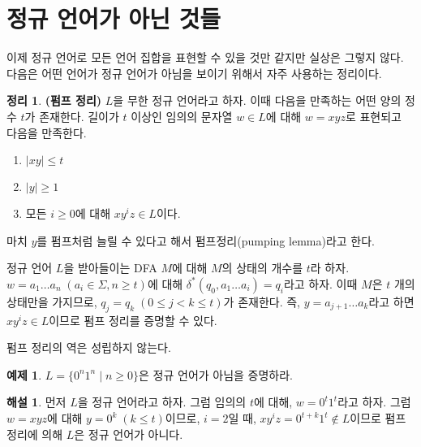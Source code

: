 \documentclass[b5paper, 11pt]{book}
\theoremstyle{definition}
\newtheorem{thm}[defn]{정리}
\newtheorem{ex}[defn]{예제}
\newtheorem*{ans*}{해설}
\newenvironment{pf*}{\pushQED{\qed}\pf}
{\popQED\endpf}
\begin{document}
\section{정규 언어가 아닌 것들}
이제 정규 언어로 모든 언어 집합을 표현할 수 있을 것만 같지만 실상은 그렇지 않다. 다음은 어떤 언어가 정규 언어가 아님을 보이기 위해서 자주 사용하는 정리이다.
\begin{thm}
    \textbf{(펌프 정리)}
    $L$을 무한 정규 언어라고 하자. 이때 다음을 만족하는 어떤 양의 정수 $t$가 존재한다. 길이가 $t$ 이상인 임의의 문자열 $w \in L$에 대해 $w = xyz$로 표현되고 다음을 만족한다.
\begin{enumerate}
    \item $\vert xy \vert \le t$
    \item $\vert y \vert \ge 1$
    \item 모든 $i \ge 0$에 대해 $xy^{i}z \in L$이다.
\end{enumerate}
\end{thm}
마치 $y$를 펌프처럼 늘릴 수 있다고 해서 펌프정리(pumping lemma)라고 한다. 
\begin{pf*}
    정규 언어 $L$을 받아들이는 DFA $M$에 대해 $M$의 상태의 개수를 $t$라 하자. $w = a_1 \ldots a_n \; (a_i \in \Sigma, n \ge t)$에 대해 $\delta^*(q_0, a_1 \ldots a_i) = q_i$라고 하자. 이때 $M$은 $t$ 개의 상태만을 가지므로, $q_j = q_k \; (0 \le j < k \le t) $가 존재한다. 즉, $y = a_{j+1} \ldots a_k$라고 하면 $xy^iz \in L$이므로 펌프 정리를 증명할 수 있다.  
\begin{figure}[ht]
    \centering
    \caption{} 
    \label{pump}
\end{figure}
\end{pf*}
펌프 정리의 역은 성립하지 않는다. 
\begin{ex} \label{0n1n}
$L = \{0^n 1^n \;\vert\; n \ge 0\}$은 정규 언어가 아님을 증명하라.
\end{ex}
\begin{ans*}
    먼저 $L$을 정규 언어라고 하자. 그럼 임의의 $t$에 대해, $w = 0^t 1^t$라고 하자. 그럼 $w=xyz$에 대해 $y = 0^k \;(k \le t)$이므로, $i=2$일 때, $xy^iz= 0^{t+k} 1^t \notin L$이므로 펌프 정리에 의해 $L$은 정규 언어가 아니다. 
\end{ans*}
\end{document}
